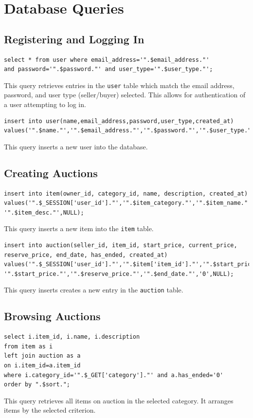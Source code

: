 \documentclass{article}
\begin{document}
\section{Database Queries}

\subsection{Registering and Logging In}
\begin{verbatim}
select * from user where email_address='".$email_address."'
and password='".$password."' and user_type='".$user_type."';
\end{verbatim}
This query retrieves entries in the \texttt{user} table which match the email address, password, and user type (seller/buyer) selected. This allows for authentication of a user attempting to log in.

\begin{verbatim}
insert into user(name,email_address,password,user_type,created_at)
values('".$name."','".$email_address."','".$password."','".$user_type."',NULL);
\end{verbatim}
This query inserts a new user into the database.

\subsection{Creating Auctions}
\begin{verbatim}
insert into item(owner_id, category_id, name, description, created_at)
values('".$_SESSION['user_id']."','".$item_category."','".$item_name."',
'".$item_desc."',NULL);
\end{verbatim}
This query inserts a new item into the \texttt{item} table.

\begin{verbatim}
insert into auction(seller_id, item_id, start_price, current_price,
reserve_price, end_date, has_ended, created_at)
values('".$_SESSION['user_id']."','".$item['item_id']."','".$start_price."',
'".$start_price."','".$reserve_price."','".$end_date."','0',NULL);
\end{verbatim}
This query inserts creates a new entry in the \texttt{auction} table.

\subsection{Browsing Auctions}
\begin{verbatim}
select i.item_id, i.name, i.description
from item as i
left join auction as a
on i.item_id=a.item_id
where i.category_id='".$_GET['category']."' and a.has_ended='0'
order by ".$sort.";
\end{verbatim}
This query retrieves all items on auction in the selected category. It arranges items by the selected criterion.
\end{document}
